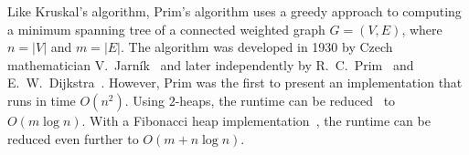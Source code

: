 Like Kruskal's algorithm,
Prim's algorithm uses a
greedy approach to computing a
minimum spanning tree of a connected
weighted graph $G = (V,E)$, where $n = |V|$ and
$m = |E|$. The algorithm was developed in 1930 by Czech mathematician
V.~Jarn\'ik~\cite{Jarnik1930} and later
independently by R.~C.~Prim~\cite{Prim1957} and
E.~W.~Dijkstra~\cite{Dijkstra1959}. However,
Prim was the first to present an implementation
that runs in time $O(n^2)$. Using $2$-heaps, the
runtime can be reduced~\cite{KershenbaumVanSlyke1972} to
$O(m \log n)$. With a Fibonacci heap
implementation~\cite{FredmanTarjan1987}, the runtime can be reduced
even further to $O(m + n \log n)$.

